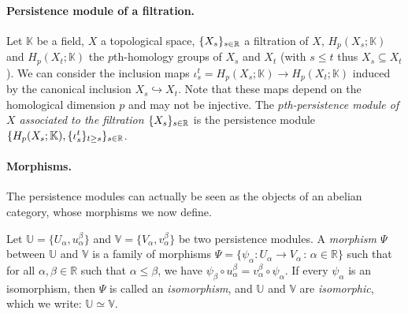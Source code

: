 
\paragraph*{Persistence module of a filtration.} Let $\mathbb{K}$ be a field, $X$ a topological space, 
$\{X_s\}_{s\in\mathbb{R}}$ a filtration of $X$, 
$H_p(X_s;\mathbb{K})$ and $H_p(X_t;\mathbb{K})$ the $p$th-homology 
groups of  $X_s$ and $X_t$ 
(with $s\leq t$ thus $X_s\subseteq X_t$). We can consider the 
inclusion maps $\iota_s^t=H_p(X_s;\mathbb{K})\rightarrow H_p(X_t;\mathbb{K})$
induced by the canonical inclusion $X_s\hookrightarrow X_t$. 
Note that these maps depend on the homological dimension $p$ and may not be injective. 
The {\em $p$th-persistence module of 
$X$ associated to the filtration $\{X_s\}_{s\in\mathbb{R}}$} is the persistence 
module $\{H_p(X_s;\mathbb{K}),\{\iota_s^t\}_{t\geq s}\}_{s\in\mathbb{R}}$.

\paragraph*{Morphisms.}
The persistence modules can actually be seen as the objects of an abelian category, 
whose morphisms we now define. 

\begin{defin} 
Let $\mathbb{U}=\{U_\alpha,u_\alpha^\beta\}$ and $\mathbb{V}=\{V_\alpha,v_\alpha^\beta\}$ be two persistence modules. 
A \textit{morphism $\Psi$} between $\mathbb{U}$ and $\mathbb{V}$ is a family of 
morphisms $\Psi=\{\psi_{\alpha}:U_{\alpha}\rightarrow V_{\alpha}\,:\,\alpha\in\mathbb{R}\}$ 
such that for all $\alpha,\beta\in \mathbb{R}$ such that $\alpha\leq\beta$, we have
$\psi_{\beta}\circ u_{\alpha}^{\beta}=v_{\alpha}^{\beta}\circ\psi_{\alpha}$. 
If every $\psi_{\alpha}$ is an isomorphism, then $\Psi$ is called an {\em isomorphism},
and $\mathbb{U}$ and $\mathbb{V}$ are {\em isomorphic}, which we write: $\mathbb{U}\simeq\mathbb{V}$.
\end{defin}

